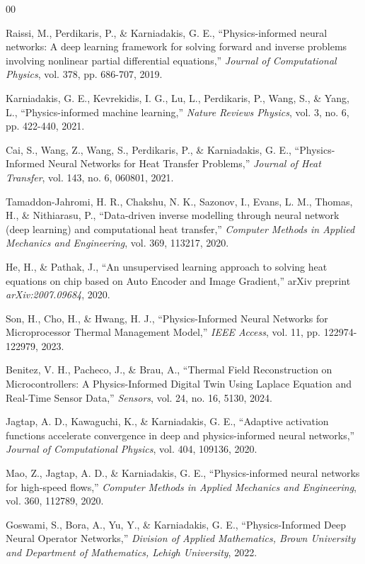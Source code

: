 \documentclass[conference]{IEEEtran}
\begin{document}
\begin{thebibliography}{00}
    
     Raissi, M., Perdikaris, P., \& Karniadakis, G. E., ``Physics-informed neural networks: A deep learning framework for solving forward and inverse problems involving nonlinear partial differential equations,'' \textit{Journal of Computational Physics}, vol. 378, pp. 686-707, 2019.
    
     Karniadakis, G. E., Kevrekidis, I. G., Lu, L., Perdikaris, P., Wang, S., \& Yang, L., ``Physics-informed machine learning,'' \textit{Nature Reviews Physics}, vol. 3, no. 6, pp. 422-440, 2021.
    
     Cai, S., Wang, Z., Wang, S., Perdikaris, P., \& Karniadakis, G. E., ``Physics-Informed Neural Networks for Heat Transfer Problems,'' \textit{Journal of Heat Transfer}, vol. 143, no. 6, 060801, 2021.
    
     Tamaddon-Jahromi, H. R., Chakshu, N. K., Sazonov, I., Evans, L. M., Thomas, H., \& Nithiarasu, P., ``Data-driven inverse modelling through neural network (deep learning) and computational heat transfer,'' \textit{Computer Methods in Applied Mechanics and Engineering}, vol. 369, 113217, 2020.
    
     He, H., \& Pathak, J., ``An unsupervised learning approach to solving heat equations on chip based on Auto Encoder and Image Gradient,'' arXiv preprint \textit{arXiv:2007.09684}, 2020.
    
     Son, H., Cho, H., \& Hwang, H. J., ``Physics-Informed Neural Networks for Microprocessor Thermal Management Model,'' \textit{IEEE Access}, vol. 11, pp. 122974-122979, 2023.
    
     Benitez, V. H., Pacheco, J., \& Brau, A., ``Thermal Field Reconstruction on Microcontrollers: A Physics-Informed Digital Twin Using Laplace Equation and Real-Time Sensor Data,'' \textit{Sensors}, vol. 24, no. 16, 5130, 2024.
    
     Jagtap, A. D., Kawaguchi, K., \& Karniadakis, G. E., ``Adaptive activation functions accelerate convergence in deep and physics-informed neural networks,'' \textit{Journal of Computational Physics}, vol. 404, 109136, 2020.
    
     Mao, Z., Jagtap, A. D., \& Karniadakis, G. E., ``Physics-informed neural networks for high-speed flows,'' \textit{Computer Methods in Applied Mechanics and Engineering}, vol. 360, 112789, 2020.
    
     Goswami, S., Bora, A., Yu, Y., \& Karniadakis, G. E., ``Physics-Informed Deep Neural Operator Networks,'' \textit{Division of Applied Mathematics, Brown University and Department of Mathematics, Lehigh University}, 2022.
    
    \end{thebibliography}
    
    
\end{document}
